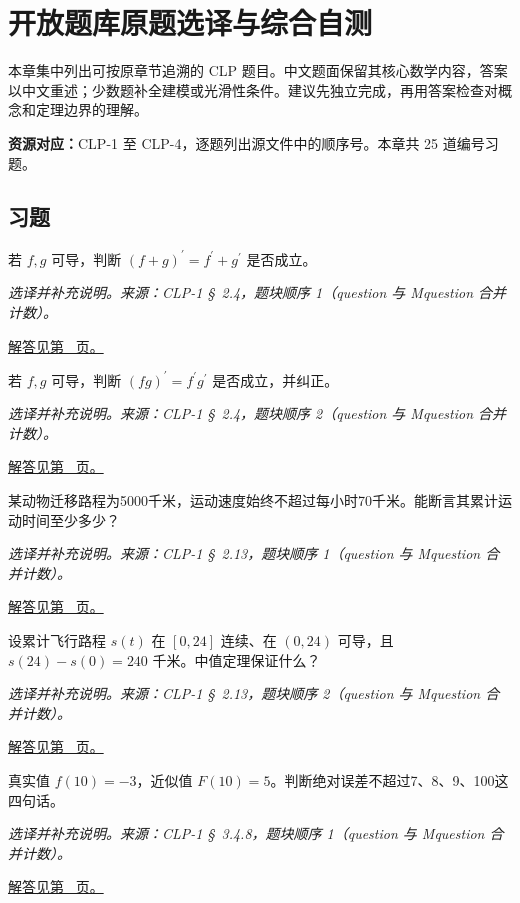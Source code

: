 \documentclass[UTF8,12pt,a4paper,fontset=fandol]{ctexart}
\begin{document}
\clearpage
\section{开放题库原题选译与综合自测}\label{sec:ch45}
本章集中列出可按原章节追溯的 CLP 题目。中文题面保留其核心数学内容，答案以中文重述；少数题补全建模或光滑性条件。建议先独立完成，再用答案检查对概念和定理边界的理解。

\textbf{资源对应：}CLP-1 至 CLP-4，逐题列出源文件中的顺序号。本章共 25 道编号习题。
\subsection{习题}
\begin{example}[求导的线性性]\label{ex:c45q1}
若 $f,g$ 可导，判断 $(f+g)^{\prime}=f^{\prime}+g^{\prime}$ 是否成立。
\par\textit{选译并补充说明。来源：CLP-1 \S~2.4，题块顺序 1（question 与 Mquestion 合并计数）。}\par\hyperref[ans:c45q1]{解答见第~\pageref{ans:c45q1} 页。}
\end{example}
\begin{example}[乘积求导的错误公式]\label{ex:c45q2}
若 $f,g$ 可导，判断 $(fg)^{\prime}=f^{\prime}g^{\prime}$ 是否成立，并纠正。
\par\textit{选译并补充说明。来源：CLP-1 \S~2.4，题块顺序 2（question 与 Mquestion 合并计数）。}\par\hyperref[ans:c45q2]{解答见第~\pageref{ans:c45q2} 页。}
\end{example}
\begin{example}[最高速度给出时间下界]\label{ex:c45q3}
某动物迁移路程为5000千米，运动速度始终不超过每小时70千米。能断言其累计运动时间至少多少？
\par\textit{选译并补充说明。来源：CLP-1 \S~2.13，题块顺序 1（question 与 Mquestion 合并计数）。}\par\hyperref[ans:c45q3]{解答见第~\pageref{ans:c45q3} 页。}
\end{example}
\begin{example}[平均变化率对应某一时刻]\label{ex:c45q4}
设累计飞行路程 $s(t)$ 在 $[0,24]$ 连续、在 $(0,24)$ 可导，且 $s(24)-s(0)=240$ 千米。中值定理保证什么？
\par\textit{选译并补充说明。来源：CLP-1 \S~2.13，题块顺序 2（question 与 Mquestion 合并计数）。}\par\hyperref[ans:c45q4]{解答见第~\pageref{ans:c45q4} 页。}
\end{example}
\begin{example}[误差上界不必最紧]\label{ex:c45q5}
真实值 $f(10)=-3$，近似值 $F(10)=5$。判断绝对误差不超过7、8、9、100这四句话。
\par\textit{选译并补充说明。来源：CLP-1 \S~3.4.8，题块顺序 1（question 与 Mquestion 合并计数）。}\par\hyperref[ans:c45q5]{解答见第~\pageref{ans:c45q5} 页。}
\end{example}
\end{document}
